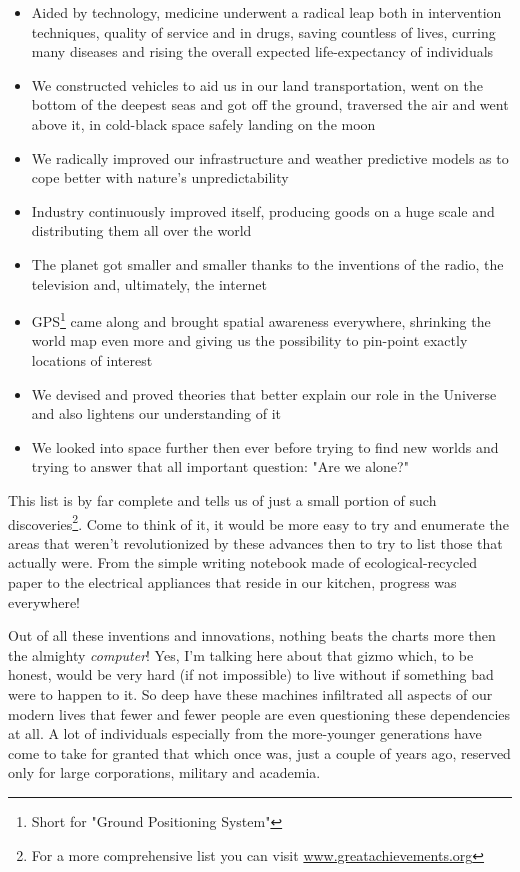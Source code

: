\documentclass[12pt, a4paper]{book}
\begin{document}
\begin{itemize}
  \item Aided by technology, medicine underwent a radical leap both in intervention techniques, quality of service and in drugs, saving countless of lives, curring many diseases and rising the overall expected life-expectancy of individuals
  \item We constructed vehicles to aid us in our land transportation, went on the bottom of the deepest seas and got off the ground, traversed the air and went above it, in cold-black space safely landing on the moon
  \item We radically improved our infrastructure and weather predictive models as to cope better with nature's unpredictability
  \item Industry continuously improved itself, producing goods on a huge scale and distributing them all over the world
  \item The planet got smaller and smaller thanks to the inventions of the radio, the television and, ultimately, the internet
  \item GPS\footnote{Short for "Ground Positioning System"} came along and brought spatial awareness everywhere, shrinking the world map even more and giving us the possibility to pin-point exactly locations of interest
  \item We devised and proved theories that better explain our role in the Universe and also lightens our understanding of it
  \item We looked into space further then ever before trying to find new worlds and trying to answer that all important question: "Are we alone?"
\end{itemize}

This list is by far complete and tells us of just a small portion of such discoveries\footnote{For a more comprehensive list you can visit \href{http://www.greatachievements.org}{www.greatachievements.org}}. Come to think of it, it would be more easy to try and enumerate the areas that weren't revolutionized by these advances then to try to list those that actually were. From the simple writing notebook made of ecological-recycled paper to the electrical appliances that reside in our kitchen, progress was everywhere!

Out of all these inventions and innovations, nothing beats the charts more then the almighty \textit{computer}! Yes, I'm talking here about that gizmo which, to be honest, would be very hard (if not impossible) to live without if something bad were to happen to it. So deep have these machines infiltrated all aspects of our modern lives that fewer and fewer people are even questioning these dependencies at all. A lot of individuals especially from the more-younger generations have come to take for granted that which once was, just a couple of years ago, reserved only for large corporations, military and academia.
\end{document}
